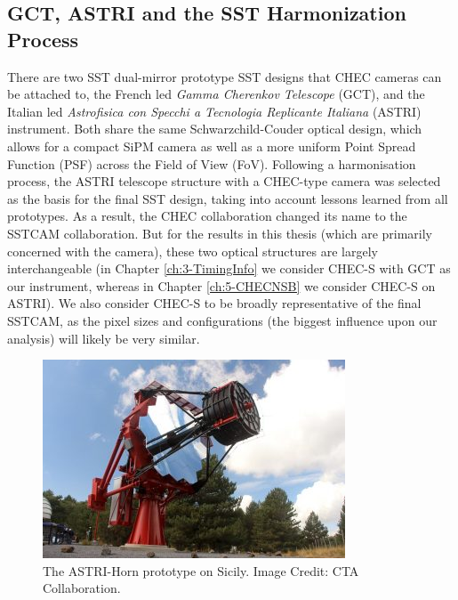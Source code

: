 \subsection{GCT, ASTRI and the SST Harmonization Process}

There are two SST dual-mirror prototype SST designs that CHEC cameras can be attached to, the French led \textit{Gamma Cherenkov Telescope} (GCT), and the Italian led \textit{Astrofisica con Specchi a Tecnologia Replicante Italiana} (ASTRI) instrument. Both share the same Schwarzchild-Couder optical design, which allows for a compact SiPM camera as well as a more uniform Point Spread Function (PSF) across the Field of View (FoV). Following a harmonisation process, the ASTRI telescope structure with a CHEC-type camera was selected as the basis for the final SST design, taking into account lessons learned from all prototypes. As a result, the CHEC collaboration changed its name to the SSTCAM collaboration. But for the results in this thesis (which are primarily concerned with the camera), these two optical structures are largely interchangeable (in Chapter \ref{ch:3-TimingInfo} we consider CHEC-S with GCT as our instrument, whereas in Chapter \ref{ch:5-CHECNSB} we consider CHEC-S on ASTRI). We also consider CHEC-S to be broadly representative of the final SSTCAM, as the pixel sizes and configurations (the biggest influence upon our analysis) will likely be very similar.

\begin{figure}[ht] 
        \centering \includegraphics[width=\columnwidth]{figures/astri-horn.jpg}
        \caption{
                \label{fig:astri} %
                The ASTRI-Horn prototype on Sicily. Image Credit: CTA Collaboration.
        }
\end{figure}

